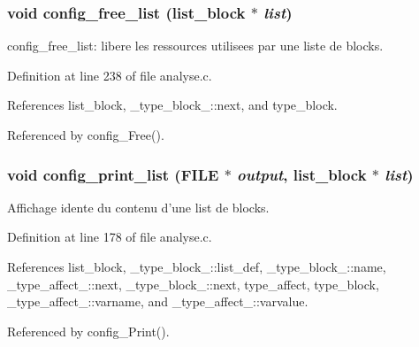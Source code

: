 \subsubsection{\setlength{\rightskip}{0pt plus 5cm}void config\_\-free\_\-list ({\bf list\_\-block} $\ast$ {\em list})}\label{analyse_8c_a8}


config\_\-free\_\-list: libere les ressources utilisees par une liste de blocks. 

Definition at line 238 of file analyse.c.

References list\_\-block, \_\-type\_\-block\_\-::next, and type\_\-block.

Referenced by config\_\-Free().
\subsubsection{\setlength{\rightskip}{0pt plus 5cm}void config\_\-print\_\-list (FILE $\ast$ {\em output}, {\bf list\_\-block} $\ast$ {\em list})}\label{analyse_8c_a6}


Affichage idente du contenu d'une list de blocks. 

Definition at line 178 of file analyse.c.

References list\_\-block, \_\-type\_\-block\_\-::list\_\-def, \_\-type\_\-block\_\-::name, \_\-type\_\-affect\_\-::next, \_\-type\_\-block\_\-::next, type\_\-affect, type\_\-block, \_\-type\_\-affect\_\-::varname, and \_\-type\_\-affect\_\-::varvalue.

Referenced by config\_\-Print().